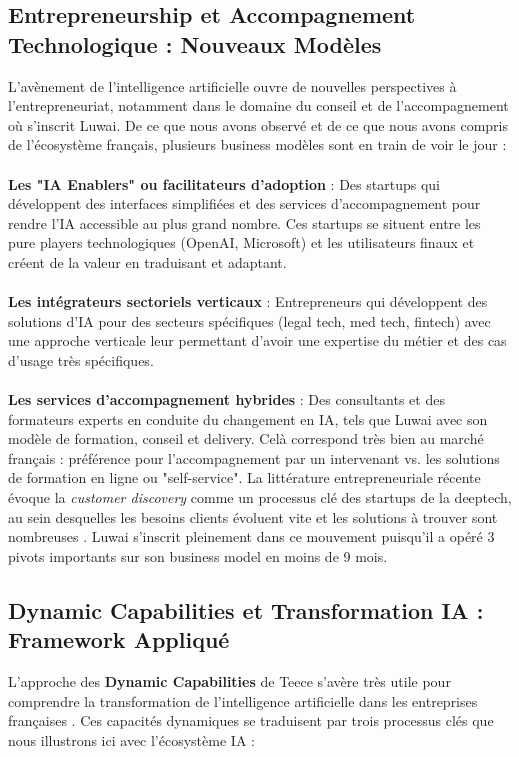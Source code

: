 \subsection{Entrepreneurship et Accompagnement Technologique : Nouveaux Modèles}

L’avènement de l’intelligence artificielle ouvre de nouvelles perspectives à l’entrepreneuriat, notamment dans le domaine du conseil et de l’accompagnement où s’inscrit Luwai. De ce que nous avons observé et de ce que nous avons compris de l’écosystème français, plusieurs business modèles sont en train de voir le jour :
\\\\
\textbf{Les "IA Enablers" ou facilitateurs d'adoption} : Des startups qui développent des interfaces simplifiées et des services d'accompagnement pour rendre l'IA accessible au plus grand nombre. Ces startups se situent entre les pure players technologiques (OpenAI, Microsoft) et les utilisateurs finaux et créent de la valeur en traduisant et adaptant\cite{parker2016platform}.
\\\\
\textbf{Les intégrateurs sectoriels verticaux} : Entrepreneurs qui développent des solutions d'IA pour des secteurs spécifiques (legal tech, med tech, fintech) avec une approche verticale leur permettant d'avoir une expertise du métier et des cas d'usage très spécifiques.
\\\\
\textbf{Les services d'accompagnement hybrides} : Des consultants et des formateurs experts en conduite du changement en IA, tels que Luwai avec son modèle de formation, conseil et delivery.
Celà correspond très bien au marché français : préférence pour l'accompagnement par un intervenant vs. les solutions de formation en ligne ou "self-service".
La littérature entrepreneuriale récente évoque la \textit{customer discovery} comme un processus clé des startups de la deeptech, au sein desquelles les besoins clients évoluent vite et les solutions à trouver sont nombreuses \cite{blank2013lean, osterwalder2014value}.  
Luwai s’inscrit pleinement dans ce mouvement puisqu’il a opéré 3 pivots importants sur son business model en moins de 9 mois.

\subsection{Dynamic Capabilities et Transformation IA : Framework Appliqué}

L’approche des \textbf{Dynamic Capabilities} de Teece s’avère très utile pour comprendre la transformation de l’intelligence artificielle dans les entreprises françaises \cite{teece2007dynamic}.  Ces capacités dynamiques se traduisent par trois processus clés que nous illustrons ici avec l’écosystème IA :

